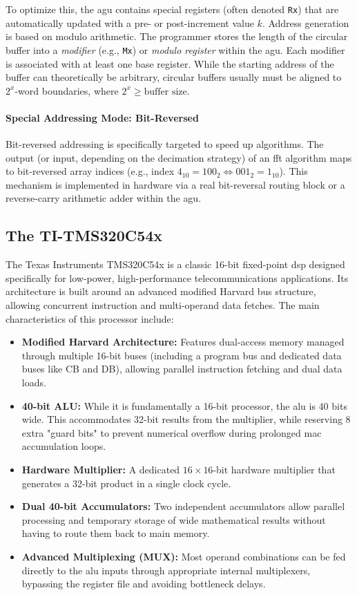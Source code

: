 \noindent To optimize this, the \gls{agu} contains special registers (often denoted \texttt{Rx}) that are automatically updated with a pre- or post-increment value \(k\). Address generation is based on modulo arithmetic. The programmer stores the length of the circular buffer into a \textit{modifier} (e.g., \texttt{Mx}) or \textit{modulo register} within the \gls{agu}. Each modifier is associated with at least one base register. While the starting address of the buffer can theoretically be arbitrary, circular buffers usually must be aligned to \(2^x\)-word boundaries, where \(2^x \geq \text{buffer size}\).

\paragraph{Special Addressing Mode: Bit-Reversed}
Bit-reversed addressing is specifically targeted to speed up  algorithms. The output (or input, depending on the decimation strategy) of an \gls{fft} algorithm maps to bit-reversed array indices (e.g., index \(4_{10} = 100_2 \Longleftrightarrow 001_2 = 1_{10}\)). This mechanism is implemented in hardware via a real bit-reversal routing block or a reverse-carry arithmetic adder within the \gls{agu}.

\subsection{The TI-TMS320C54x }
The Texas Instruments TMS320C54x is a classic 16-bit fixed-point \gls{dsp} designed specifically for low-power, high-performance telecommunications applications. Its architecture is built around an advanced modified Harvard bus structure, allowing concurrent instruction and multi-operand data fetches. The main characteristics of this processor include:
\begin{itemize}
    \item \textbf{Modified Harvard Architecture:} Features dual-access memory managed through multiple 16-bit buses (including a program bus and dedicated data buses like CB and DB), allowing parallel instruction fetching and dual data loads.
    \item \textbf{40-bit ALU:} While it is fundamentally a 16-bit processor, the \gls{alu} is 40 bits wide. This accommodates 32-bit results from the multiplier, while reserving 8 extra "guard bits" to prevent numerical overflow during prolonged \gls{mac} accumulation loops.
    \item \textbf{Hardware Multiplier:} A dedicated $16 \times 16$-bit hardware multiplier that generates a 32-bit product in a single clock cycle.
    \item \textbf{Dual 40-bit Accumulators:} Two independent accumulators allow parallel processing and temporary storage of wide mathematical results without having to route them back to main memory.
    \item \textbf{Advanced Multiplexing (MUX):} Most operand combinations can be fed directly to the \gls{alu} inputs through appropriate internal multiplexers, bypassing the register file and avoiding bottleneck delays.
\end{itemize}